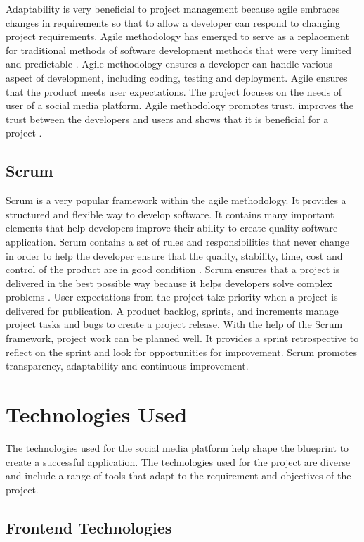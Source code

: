 Adaptability is very beneficial to project management because agile embraces changes in requirements so that to allow a developer can respond to changing project requirements. Agile methodology has emerged to serve as a replacement for traditional methods of software development methods that were very limited and predictable \cite{altameem2015impact}. Agile methodology ensures a developer can handle various aspect of development, including coding, testing and deployment. Agile ensures that the product meets user expectations. The project focuses on the needs of user of a social media platform. Agile methodology promotes trust, improves the trust between the developers and users and shows that it is beneficial for a project \cite{altameem2015impact}.

\subsection{Scrum}
Scrum is a very popular framework within the agile methodology. It provides a structured and flexible way to develop software. It contains many important elements that help developers improve their ability to create quality software application. Scrum contains a set of rules and responsibilities that never change in order to help the developer ensure that the quality, stability, time, cost and control of the product are in good condition \cite{darwish2016requirements}. Scrum ensures that a project is delivered in the best possible way because it helps developers solve complex problems \cite{darwish2016requirements}. User expectations from the project take priority when a project is delivered for publication. A product backlog, sprints, and increments manage project tasks and bugs to create a project release. With the help of the Scrum framework, project work can be planned well. It provides a sprint retrospective to reflect on the sprint and look for opportunities for improvement. Scrum promotes transparency, adaptability and continuous improvement. 

\section{ Technologies Used} 
The technologies used for the social media platform help shape the blueprint to create a successful application. The technologies used for the project are diverse and include a range of tools that adapt to the requirement and objectives of the project.

\subsection{Frontend Technologies}
